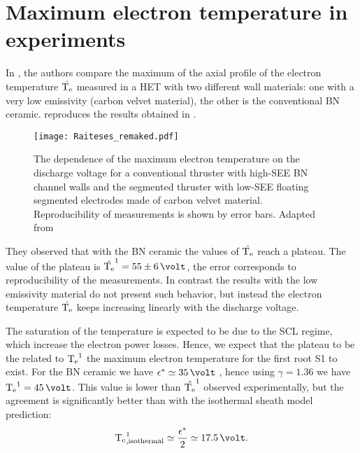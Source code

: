 

    
    \section{Maximum electron temperature in experiments}
    
    
    In \citet{raitses2006}, the authors compare the maximum of the axial profile of the electron temperature $\hat{\mathrm{T_e}}$ measured in a \ac{HET} with two different wall materials\string: one with a very low emissivity (carbon velvet material), the other is the conventional \ac{BN} ceramic.
     reproduces the results obtained in \citet{raitses2006}.

    \begin{figure}[hbt]
      \centering
      \texttt{[image: Raiteses\_remaked.pdf]}
      \caption{ The dependence of the maximum electron temperature on the discharge  voltage for a conventional thruster with high-SEE \acs{BN} channel walls and the segmented thruster with low-SEE floating segmented electrodes made of carbon velvet material. Reproducibility of measurements is shown by error bars. Adapted from \citet[Fig. 3]{raitses2006} }
      \label{fig-raiteses2006}
    \end{figure}

    They observed that with the \ac{BN} ceramic the values of $\hat{\mathrm{T_e}}$ reach a plateau.
    The value of the plateau is $\hat{\Te}^1 = 55 \pm 6\,\volt$, the error corresponds to reproducibility of the measurements.
    In contrast the results with the low emissivity material do not present such behavior, but instead the electron temperature $\hat{\mathrm{T_e}}$ keeps increasing linearly with the discharge voltage.
    
    The saturation of the temperature is expected to be due to the \ac{SCL} regime, which increase the electron power losses.
    Hence, we expect that the plateau to be the related to $\mathrm{T_e}^1$ the maximum electron temperature for the first root S1 to exist.
    For the \ac{BN} ceramic we have $\crover \simeq 35\,\volt$ \citep{smirnov2004}, hence using $\gamma=1.36$ we have $\Te^1 = 45\,\volt$.
    This value is lower than $\hat{\mathrm{T_e}}^1$ observed experimentally, but the agreement is significantly better than with the isothermal sheath model prediction\string:
    \begin{equation} \label{eq-Temaxisothermal}
      \Te^1_{\rm , isothermal} \simeq \frac{\crover}{2} \simeq 17.5 \,\volt.
    \end{equation}
    
